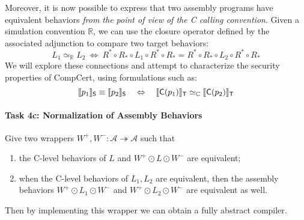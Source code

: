 Moreover,
it is now possible to express that two assembly programs
have equivalent behaviors
\emph{from the point of view of the C calling convention}.
Given a simulation convention $\mathbb{R}$,
we can use the closure operator defined by the associated adjunction
to compare two target behaviors:
\[
  L_1 \simeq_\mathbb{R} L_2 \: \Leftrightarrow \:
  R^* \circ R_* \circ L_1 \circ R^* \circ R_* =
  R^* \circ R_* \circ L_2 \circ R^* \circ R_*
\]
We will explore these connections and attempt to characterize
the security properties of CompCert,
using formulations such as:
\[
  \llbracket p_1 \rrbracket_{ \mathsf{S} } \equiv
  \llbracket p_2 \rrbracket_{ \mathsf{S} }
  \quad \Leftrightarrow \quad
  \llbracket  \mathsf{C} (p_1) \rrbracket_{ \mathsf{T} } \simeq_\mathbb{C}
  \llbracket  \mathsf{C} (p_2) \rrbracket_{ \mathsf{T} }
\]

\vspace*{-2ex}
\paragraph*{Task 4c: Normalization of Assembly Behaviors}

Give two wrappers $W^+, W^- : \mathcal{A} \twoheadrightarrow \mathcal{A}$
such that
\begin{enumerate}
  \item the C-level behaviors of $L$ and $W^+ \odot L \odot W^-$
    are equivalent;
  \item when the C-level behaviors of $L_1, L_2$ are equivalent,
    then the assembly behaviors
    $W^+ \odot L_1 \odot W^-$ and
    $W^+ \odot L_2 \odot W^-$
    are equivalent as well.
\end{enumerate}
Then by implementing this wrapper
we can obtain a fully abstract compiler.

